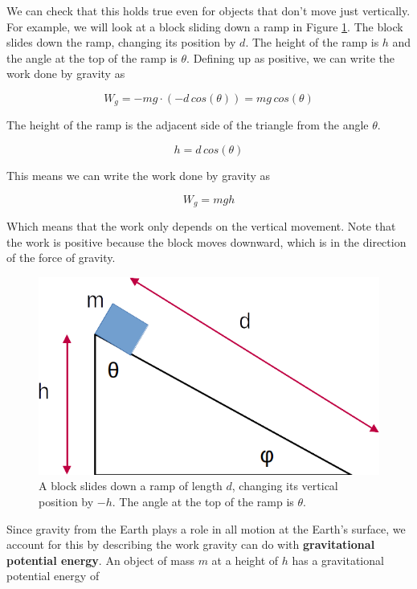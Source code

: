 \documentclass[12pt]{book}
\begin{document}
We can check that this holds true even for objects that don't move just vertically. For example, we will look at a block sliding down a ramp in Figure \ref{gravramp}. The block slides down the ramp, changing its position by $d$. The height of the ramp is $h$ and the angle at the top of the ramp is $\theta$. Defining up as positive, we can write the work done by gravity as 

\begin{equation}
W_g = -mg \cdot (-d \, cos(\theta)) = mg \, cos(\theta)
\end{equation}

The height of the ramp is the adjacent side of the triangle from the angle $\theta$.

\begin{equation}
h = d \, cos(\theta)
\end{equation}

This means we can write the work done by gravity as

\begin{equation}
W_g = mgh
\end{equation}

Which means that the work only depends on the vertical movement. Note that the work is positive because the block moves downward, which is in the direction of the force of gravity.

\begin{figure}[t]
\centering
\includegraphics[scale=0.3]{gravity_ramp.png}
\caption{A block slides down a ramp of length $d$, changing its vertical position by $-h$. The angle at the top of the ramp is $\theta$.}
\label{gravramp}
\end{figure}

Since gravity from the Earth plays a role in all motion at the Earth's surface, we account for this by describing the work gravity can do with \textbf{gravitational potential energy}. An object of mass $m$ at a height of $h$ has a gravitational potential energy of
\end{document}
